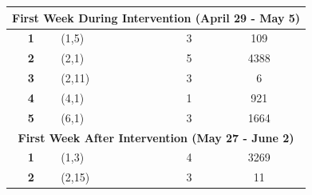 \begin{table}[t]
\begin{tabular}{clcc}
\multicolumn{4}{c}{\cellcolor[HTML]{ECF4FF}\textbf{First Week During Intervention (April 29 - May 5)}}                                                                                                                                                                      \\ \hline
\textbf{1}             & (1,5)                                                                      & 3                                                                           & 109                                                                                     \\ \hline
\textbf{2}             & (2,1)                                                                      & 5                                                                           & 4388                                                                                    \\ \hline
\textbf{3}             & (2,11)                                                                     & 3                                                                           & 6                                                                                       \\ \hline
\textbf{4}             & (4,1)                                                                      & 1                                                                           & 921                                                                                     \\ \hline
\textbf{5}             & (6,1)                                                                      & 3                                                                           & 1664                                                                                    \\ \hline
\multicolumn{4}{c}{\cellcolor[HTML]{ECF4FF}\textbf{First Week After Intervention (May 27 - June 2)}}                                                                                                                                                                        \\ \hline
\textbf{1}             & (1,3)                                                                      & 4                                                                           & 3269                                                                                    \\ \hline
\textbf{2}             & (2,15)                                                                     & 3                                                                           & 11                                                                                      \\ \hline

\end{tabular}
\end{table}
